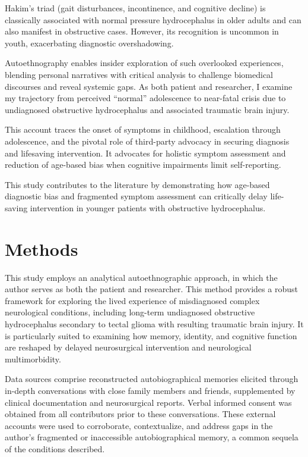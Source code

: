 \documentclass{article}
\begin{document}
Hakim’s triad (gait disturbances, incontinence, and cognitive decline) is classically associated with normal pressure hydrocephalus in older adults and can also manifest in obstructive cases. However, its recognition is uncommon in youth, exacerbating diagnostic overshadowing.

Autoethnography enables insider exploration of such overlooked experiences, blending personal narratives with critical analysis to challenge biomedical discourses and reveal systemic gaps. As both patient and researcher\cite{anderson2006, ellis2011}, I examine my trajectory from perceived “normal” adolescence to near-fatal crisis due to undiagnosed obstructive hydrocephalus and associated traumatic brain injury.

This account traces the onset of symptoms in childhood, escalation through adolescence, and the pivotal role of third-party advocacy in securing diagnosis and lifesaving intervention. It advocates for holistic symptom assessment and reduction of age-based bias when cognitive impairments limit self-reporting.

This study contributes to the literature by demonstrating how age-based diagnostic bias and fragmented symptom assessment can critically delay life-saving intervention in younger patients with obstructive hydrocephalus.

\section*{Methods}
This study employs an analytical autoethnographic approach, in which the author serves as both the patient and researcher. This method provides a robust framework for exploring the lived experience of misdiagnosed complex neurological conditions, including long-term undiagnosed obstructive hydrocephalus secondary to tectal glioma with resulting traumatic brain injury.  It is particularly suited to examining how memory, identity, and cognitive function are reshaped by delayed neurosurgical intervention and neurological multimorbidity\cite{anderson2006,ellis2011}.

Data sources comprise reconstructed autobiographical memories elicited through in-depth conversations with close family members and friends, supplemented by clinical documentation and neurosurgical reports. Verbal informed consent was obtained from all contributors prior to these conversations. These external accounts were used to corroborate, contextualize, and address gaps in the author's fragmented or inaccessible autobiographical memory, a common sequela of the conditions described. 
\end{document}
